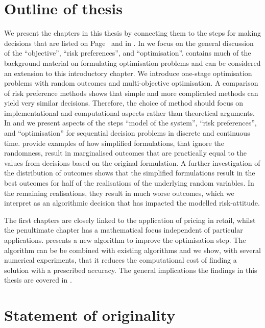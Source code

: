 \documentclass[main.tex]{subfiles}
\begin{document}
\section{Outline of thesis}
We present the chapters in this thesis by connecting them to the
steps for making decisions that are listed
on Page~\pageref{enum:making_decisions} and in .
In  we focus on the general discussion of the
``objective'', ``risk preferences'', and ``optimisation''.
 contains much of the background material on formulating
optimisation problems and can be considered an extension to this
introductory chapter. We introduce one-stage optimisation problems with
random outcomes and multi-objective optimisation.
A comparison of risk preference methods shows that simple and more complicated
methods can yield very similar decisions. Therefore, the choice of
method should focus on implementational and computational aspects
rather than theoretical arguments.
In  and
 we present  aspects of the steps ``model of the system'', ``risk
preferences'', and ``optimisation'' for sequential decision problems
in discrete and continuous time.
 provide examples of
how simplified formulations, that ignore the randomness, result in
marginalised outcomes that are practically equal to the values from
decisions based on the original formulation. A further investigation
of the distribution of outcomes shows that the simplified formulations
result in the best outcomes for half of the realisations of the
underlying random variables. In the remaining realisations, they
result in much worse outcomes, which we interpret as an algorithmic
decision that has impacted the modelled risk-attitude.

The first chapters are closely linked to the application of pricing
in retail, whilst the penultimate chapter has a mathematical focus
independent of particular applications.
 presents a new
algorithm to improve the optimisation step. The algorithm can be
be combined with existing algorithms and we show, with several
numerical experiments, that it reduces the computational cost of
finding a solution with a prescribed accuracy.
The general implications the findings in this thesis are covered in
.

\section{Statement of originality}


\biblio{} %
\end{document}
